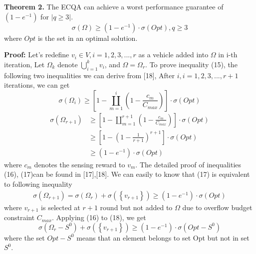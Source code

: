 \documentclass[journal]{IEEEtran}
\begin{document}
\noindent
\textbf{Theorem 2.} The ECQA can achieve a worst performance guarantee of  $\left (1-e^{-1}  \right )$ for $\left |q\geqslant 3 \right|$. 
\begin{equation}
\sigma (\Omega )\geqslant \left (1-e^{-1}  \right )\cdot \sigma (Opt), q\geqslant 3
\end{equation}
where $Opt$ is the set in an optimal solution.

\noindent
\textbf{Proof:} Let’s redefine $v_{i}\in V,i=1,2,3,...,r$ as a vehicle added into $\Omega$ in i-th iteration, Let $\Omega_{k}$ denote $ \bigcup_{i=1}^{k}v_{i}$, and $\Omega =\Omega _{r}$. To prove inequality (15), the following two inequalities we can derive from [18], After $i,i=1,2,3,...,r+1$ iterations, we can get
\begin{equation}
\sigma (\Omega _{i})\geqslant \left [ 1-\coprod_{m=1}^{i}(1-\frac{c_{m}}{C_{max}}) \right ]\cdot \sigma (Opt)
\end{equation}
\begin{equation}
\begin{aligned}
\sigma (\Omega _{r+1})&\geqslant \left [ 1-\coprod_{m=1}^{r+1}(1-\frac{c_{m}}{C_{max}}) \right ]\cdot \sigma (Opt) \\ & \geqslant \left [ 1-\left ( 1-\frac{1}{r+1} \right )^{r+1} \right ]\cdot\sigma (Opt)\\&\geqslant \left (1-e^{-1}  \right )\cdot\sigma (Opt) 
\end{aligned}
\end{equation}
where $c_{m}$ denotes the sensing reward to $v_{m}$. The detailed proof of inequalities (16), (17)can be found in [17],[18]. We can easily to know that (17) is equivalent to following inequality
\begin{equation}
\begin{aligned}
\sigma (\Omega _{r+1})=\sigma(\Omega _{r})+\sigma(\left \{ v_{r+1}\right \})\geqslant\left ( 1-e^{-1} \right ) \cdot \sigma (Opt)
\end{aligned}
\end{equation}
where $v_{r+1}$ is selected at $r+1$ round but not added to $\Omega$ due to overflow budget constraint $C_{max}$. Applying (16) to (18), we get
\begin{equation}
\sigma (\Omega _{r}-S^{0})+\sigma (\left \{ v_{r+1} \right \})\geqslant \left ( 1-e^{-1} \right )\cdot \sigma (Opt-S^{0})
\end{equation}
where the set $Opt-S^{0}$ means that an element belongs to set Opt but not in set $S^{0}$.
\end{document}

